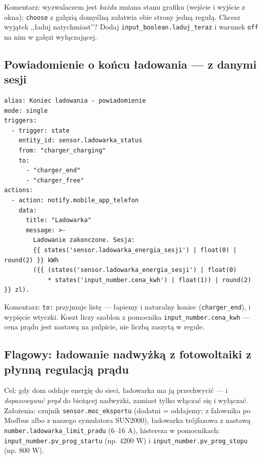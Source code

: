 \documentclass[11pt,a4paper]{article}
\begin{document}
Komentarz: wyzwalaczem jest \emph{każda} zmiana stanu grafiku (wejście i wyjście z okna); \texttt{choose} z gałęzią domyślną załatwia obie strony jedną regułą. Chcesz wyjątek ,,ładuj natychmiast''? Dodaj \texttt{input\_boolean.laduj\_teraz} i warunek \texttt{off} na nim w gałęzi wyłączającej.

\subsection{Powiadomienie o końcu ładowania --- z danymi sesji}

\begin{lstlisting}
alias: Koniec ladowania - powiadomienie
mode: single
triggers:
  - trigger: state
    entity_id: sensor.ladowarka_status
    from: "charger_charging"
    to:
      - "charger_end"
      - "charger_free"
actions:
  - action: notify.mobile_app_telefon
    data:
      title: "Ladowarka"
      message: >-
        Ladowanie zakonczone. Sesja:
        {{ states('sensor.ladowarka_energia_sesji') | float(0) | round(2) }} kWh
        ({{ (states('sensor.ladowarka_energia_sesji') | float(0)
            * states('input_number.cena_kwh') | float(1)) | round(2) }} zl).
\end{lstlisting}

Komentarz: \texttt{to:} przyjmuje listę --- łapiemy i naturalny koniec (\texttt{charger\_end}), i wypięcie wtyczki. Koszt liczy szablon z pomocnika \texttt{input\_number.cena\_kwh} --- cena prądu jest nastawą na pulpicie, nie liczbą zaszytą w regule.

\subsection{Flagowy: ładowanie nadwyżką z fotowoltaiki z płynną regulacją prądu}
\label{sec:przepis-pv}

Cel: gdy dom oddaje energię do sieci, ładowarka ma ją przechwycić --- i \emph{dopasowywać prąd} do bieżącej nadwyżki, zamiast tylko włączać się i wyłączać. Założenia: czujnik \texttt{sensor.moc\_eksportu} (dodatni = oddajemy; z falownika po Modbus albo z naszego symulatora SUN2000), ładowarka trójfazowa z nastawą \texttt{number.ladowarka\_limit\_pradu} (6--16 A), histereza w pomocnikach: \texttt{input\_number.pv\_prog\_startu} (np. 4200 W) i \texttt{input\_number.pv\_prog\_stopu} (np. 800 W).
\end{document}
